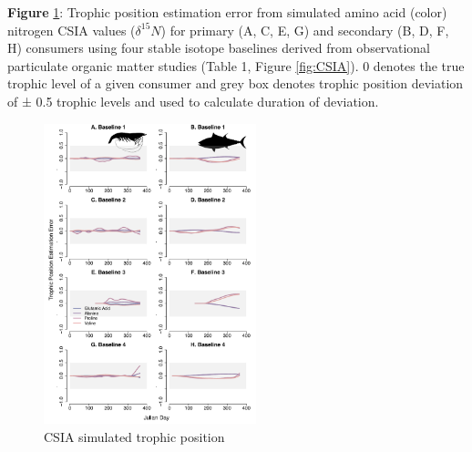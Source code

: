 \documentclass [11pt, proquest] {uwthesis}[2015/03/03]
\begin{document}
\textbf{Figure} \ref{fig:CSIATP}: Trophic position estimation error from
simulated amino acid (color) nitrogen CSIA values (\(\delta^{15}N\)) for
primary (A, C, E, G) and secondary (B, D, F, H) consumers using four
stable isotope baselines derived from observational particulate organic
matter studies (Table 1, Figure \ref{fig:CSIA}). 0 denotes the true
trophic level of a given consumer and grey box denotes trophic position
deviation of ± 0.5 trophic levels and used to calculate duration of
deviation. \newline 
\begin{figure}[h]
\centering
  \includegraphics[width=0.55\textwidth]{figure/Ch5/Figure7.pdf}
  \caption{CSIA simulated trophic position}
  \label{fig:CSIATP}
\end{figure}
\clearpage
\end{document}
